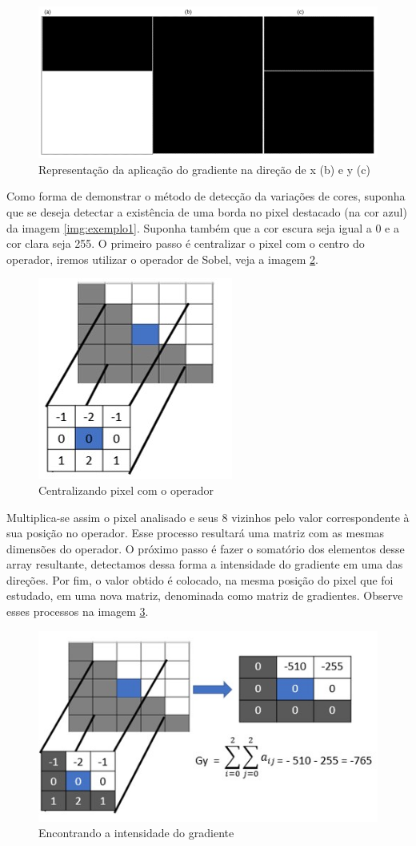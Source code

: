 \documentclass[a4paper,alpha-refs]{RBCA_v1.0}
\begin{document}
\begin{figure}[h!]
	\centering
	\includegraphics[width=.5\textwidth]{img/gradiente.png}
	\caption{Representação da aplicação do gradiente na direção de x (b) e y (c)}
	\label{img:gradiente}
\end{figure}

Como forma de demonstrar o método de detecção da variações de cores, suponha que se deseja detectar a existência de uma borda no pixel destacado (na cor azul) da imagem \ref{img:exemplo1}. Suponha também que a cor escura seja igual a 0 e a cor clara seja 255. O primeiro passo é centralizar o pixel com o centro do operador, iremos utilizar o operador de Sobel, veja a imagem \ref{img:Primeira}.

\begin{figure}[h!]
	\centering
	\includegraphics[width=.3\textwidth]{img/1im.jpg}
	\caption{Centralizando pixel com o operador}
	\label{img:Primeira}
\end{figure}

Multiplica-se assim o pixel analisado e seus 8 vizinhos pelo valor correspondente à sua posição no operador. Esse processo resultará uma matriz com as mesmas dimensões do operador. O próximo passo é fazer o somatório dos elementos desse array resultante, detectamos dessa forma a intensidade do gradiente em uma das direções. Por fim, o valor obtido é colocado, na mesma posição do pixel que foi estudado, em uma nova matriz, denominada como matriz de gradientes. Observe esses processos na imagem \ref{img:grady}. 

\begin{figure}[h!]
	\centering
	\includegraphics[width=.3\textwidth]{img/grady.jpg}
	\caption{Encontrando a intensidade do gradiente}
	\label{img:grady}
\end{figure}
\end{document}
